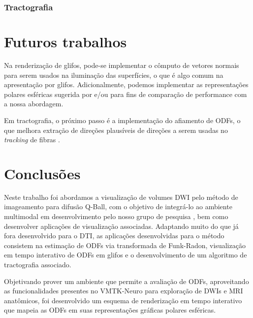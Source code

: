 \documentclass[
    12pt,                %
    oneside,            %
    a4paper,            %
    english,            %
    french,                %
    spanish,            %
    brazil                %
    ]{abntex2}
\begin{document}

\subsection{Tractografia}

\chapter{Futuros trabalhos}

Na renderização de glifos, pode-se implementar o cômputo de vetores normais para serem usados na iluminação das superfícies, o que é algo comum na apresentação por glifos. Adicionalmente, podemos implementar as representações polares esféricas sugerida por  e/ou  para fins de comparação de performance com a nossa abordagem.

Em tractografia, o próximo passo é a implementação do afiamento de ODFs, o que melhora extração de direções plausíveis de direções a serem usadas no \textit{tracking} de fibras \cite{fillard2011, SCHILLING2019194}.



\chapter{Conclusões}

Neste trabalho foi abordamos a visualização de volumes DWI pelo método de imageamento para difusão Q-Ball, com o objetivo de integrá-lo ao ambiente multimodal em desenvolvimento pelo nosso grupo de pesquisa \cite{VMTKNeuro}, bem como desenvolver aplicações de visualização associadas. Adaptando muito do que já fora desenvolvido para o DTI, as aplicações desenvolvidas para o método consistem na estimação de ODFs via transformada de Funk-Radon, visualização em tempo interativo de ODFs em glifos e o desenvolvimento de um algoritmo de tractografia associado.

Objetivando prover um ambiente que permite a avaliação de ODFs, aproveitando as funcionalidades presentes no VMTK-Neuro para exploração de DWIs e MRI anatômicos, foi desenvolvido um esquema de renderização em tempo interativo que mapeia as ODFs em suas representações gráficas polares esféricas.
\end{document}
